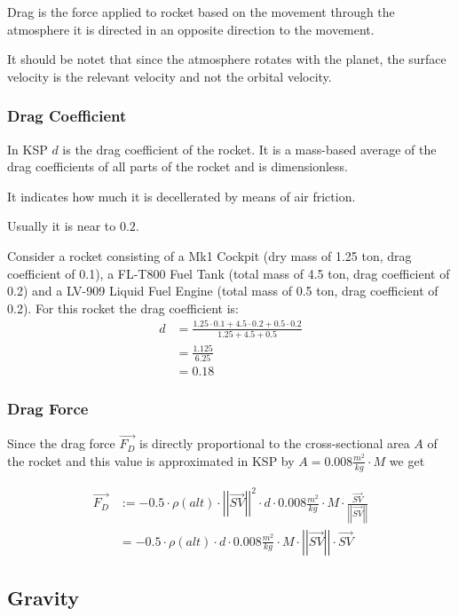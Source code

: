 \documentclass[11pt]{article}
\newcommand{\oa}[1]{\overrightarrow{#1}}
\newcommand{\F}[1]{\oa{F_{#1}}}
\newcommand{\absvec}[1]{\left|\left|{#1}\right|\right|}
\begin{document}
 Drag is the force applied to rocket based on the movement through the
atmosphere it is directed in an opposite direction to the movement.

It should be notet that since the atmosphere rotates with the planet,
the surface velocity is the relevant velocity and not the orbital
velocity.

\subsubsection{Drag Coefficient}

In KSP $d$ is the  drag coefficient of the
rocket. It is a mass-based average of the drag coefficients of all
parts of the rocket and is dimensionless.

It indicates how much it is decellerated by means of air friction.

Usually it is near to $0.2$.

Consider a rocket consisting of a Mk1 Cockpit (dry mass of 1.25 ton,
drag coefficient of 0.1), a FL-T800 Fuel Tank (total mass of 4.5 ton,
drag coefficient of 0.2) and a LV-909 Liquid Fuel Engine (total mass
of 0.5 ton, drag coefficient of 0.2). For this rocket the drag
coefficient is:
\begin{align}
  d &= \frac{1.25 \cdot 0.1 + 4.5 \cdot 0.2 + 0.5 \cdot 0.2}{ 1.25 + 4.5 + 0.5 }\nonumber\\
  &= \frac{1.125}{6.25}\nonumber\\
  &= 0.18\nonumber
\end{align}

\subsubsection{Drag Force}

Since the drag force $\F{D}$ is directly proportional to the
cross-sectional area $A$ of the rocket and this value is approximated
in KSP by $A = 0.008 \frac{m^2}{kg} \cdot M$ we get

\begin{align}
  \F{D} &:= - 0.5 \cdot \rho(alt)\cdot \absvec{\oa{SV}}^2\cdot d \cdot 0.008\frac{m^2}{kg} \cdot M \cdot \frac{\oa{SV}}{\absvec{\oa{SV}}} \nonumber\\
  &= - 0.5 \cdot \rho(alt)\cdot d \cdot 0.008\frac{m^2}{kg} \cdot M \cdot \absvec{\oa{SV}} \cdot \oa{SV}
\end{align}

\subsection{Gravity}
\end{document}
